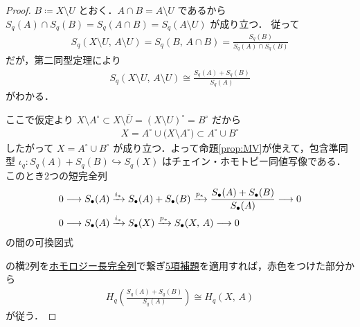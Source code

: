 \documentclass[algtopo_main]{subfiles}
\begin{document}
\begin{proof}
    $B \coloneqq X \setminus U$ とおく．$A \cap B = A \setminus U$ であるから $S_q(A) \cap S_q(B) = S_q (A \cap B) = S_q(A \setminus U)$ が成り立つ．
    従って
    \begin{align}
        S_q(X\setminus U,\, A \setminus U) = S_q(B,\, A \cap B) = \frac{S_q (B)}{S_q(A) \cap S_q(B)}
    \end{align}
    だが，第二同型定理により
    \begin{align}
        S_q(X\setminus U,\, A \setminus U) \cong \frac{S_q(A) + S_q(B)}{S_q(A)}
    \end{align}
    がわかる．

    ここで仮定より $X \setminus A^\circ \subset X \setminus \overline{U} = (X \setminus U)^\circ = B^\circ$ だから
    \begin{align}
        \label{eq:exc}
        X = A^\circ \cup \bigl(X \setminus A^\circ\bigr) \subset A^\circ \cup B^\circ
    \end{align}
    したがって $X = A^\circ \cup B^\circ$ が成り立つ．よって命題\ref{prop:MV}が使えて，包含準同型 $\iota_q \colon S_q (A) + S_q(B) \hookrightarrow S_q(X)$ はチェイン・ホモトピー同値写像である．
    このとき2つの短完全列
    \begin{align}
        0 &\longrightarrow S_\bullet (A) \xrightarrow{i_*} S_\bullet (A) + S_\bullet(B) \xrightarrow{p_*} \frac{S_\bullet (A) + S_\bullet(B)}{S_\bullet (A)} \longrightarrow 0 \\
        0 &\longrightarrow S_\bullet (A) \xrightarrow{i_*} S_\bullet (X) \xrightarrow{p_*} S_\bullet (X,\, A) \longrightarrow 0
    \end{align}
    の間の可換図式
    \begin{center}
    \end{center}
    の横2列を\hyperref[prop:HES]{ホモロジー長完全列}で繋ぎ\hyperref[thm:five-lemma]{5項補題}を適用すれば，赤色をつけた部分から
    \begin{align}
        H_q\left(\frac{S_q(A) + S_q(B)}{S_q(A)}\right) \cong H_q(X,\, A)
    \end{align}
    が従う．
\end{proof}
\end{document}
